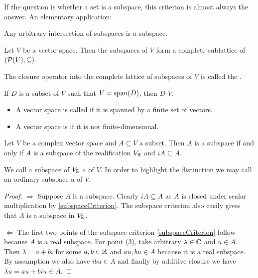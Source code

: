 If the question is whether a set is a subspace, this criterion is almost always the answer. An elementary application:
\begin{proposition}
Any arbitrary intersection of subspaces is a subspace.
\end{proposition}
\begin{corollary}
Let $V$ be a vector space. Then the subspaces of $V$ form a complete sublattice of $\left( \operatorname{\mathcal{P}}(V),\subseteq \right)$.
\end{corollary}

\begin{definition}
The closure operator into the complete lattice of subspaces of $V$ is called the .

If $D$ is a subset of $V$ such that $V = \operatorname{span}(D)$, then $D$  $V$.

\begin{itemize}
\item A vector space is called  if it is spanned by a finite set of vectors.
\item A vector space is  if it is not finite-dimensional.
\end{itemize}
\end{definition}

\begin{lemma} \label{realSubspaceComplexVectorSpace}
Let $V$ be a complex vector space and $A\subseteq V$ a subset. Then $A$ is a subspace \textup{if and only if} $A$ is a subspace of the realification $V_{\mathbb{R}}$ and $iA \subseteq A$.
\end{lemma}
We call a subspace of $V_{\mathbb{R}}$ a  of $V$. In order to highlight the distinction we may call an ordinary subspace a  of $V$.
\begin{proof}
$\boxed{\Rightarrow}$ Suppose $A$ is a subspace. Clearly $iA \subseteq A$ as $A$ is closed under scalar multiplication by \ref{subspaceCriterion}. The subspace criterion also easily gives that $A$ is a subspace in $V_{\mathbb{R}}$.

$\boxed{\Leftarrow}$ The first two points of the subspace criterion \ref{subspaceCriterion} follow because $A$ is a real subspace. For point (3), take arbitrary $\lambda \in \mathbb{C}$ and $u\in A$. Then $\lambda = a+bi$ for some $a,b\in \mathbb{R}$ and $au,bu\in A$ because it is a real subspace. By assumption we also have $ibu\in A$ and finally by additive closure we have $\lambda u = au+biu \in A$.
\end{proof}

